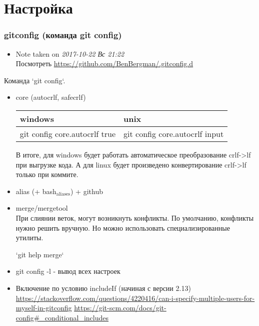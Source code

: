 \section{Настройка}
\label{sec-2}
\begin{frame}
\frametitle{gitconfig (команда git config)}
\label{sec-2-1}

\begin{itemize}
\item Note taken on \textit{2017-10-22 Вс 21:22} \\
Посмотреть \href{https://github.com/BenBergman/.gitconfig.d}{https://github.com/BenBergman/.gitconfig.d}
\end{itemize}
Команда `git config`. 
\begin{itemize}

\item core (autocrlf, safecrlf)\\
\label{sec-2-1-1}%
\begin{center}
\begin{tabular}{ll}
 windows                        &  unix                            \\
\hline
 git config core.autocrlf true  &  git config core.autocrlf input  \\
\end{tabular}
\end{center}


В итоге, для windows будет работать автоматическое преобразование
crlf->lf при выгрузке кода. А для linux будет произведено
конвертирование crlf->lf только при коммите.

\item alias (+ bash$_{\mathrm{aliases}}$) + github
\label{sec-2-1-2}%

\item merge/mergetool\\
\label{sec-2-1-3}%
При слиянии веток, могут возникнуть конфликты. По умолчанию, конфликты
нужно решить вручную. Но можно использовать специализированные
утилиты.

`git help merge`

\item git config -l - вывод всех настроек
\label{sec-2-1-4}%

\item Включение по условию includeIf (начиная с версии 2.13)\\
\label{sec-2-1-5}%
\href{https://stackoverflow.com/questions/4220416/can-i-specify-multiple-users-for-myself-in-gitconfig}{https://stackoverflow.com/questions/4220416/can-i-specify-multiple-users-for-myself-in-gitconfig}
\href{https://git-scm.com/docs/git-config#_conditional_includes}{https://git-scm.com/docs/git-config\#\_conditional\_includes}
\end{itemize} %
\end{frame}
